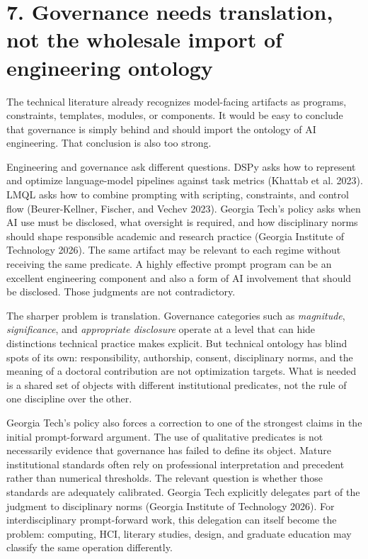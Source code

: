 \documentclass[
]{article}
\begin{document}
\section{7. Governance needs translation, not the wholesale import of
engineering
ontology}\label{governance-needs-translation-not-the-wholesale-import-of-engineering-ontology}

The technical literature already recognizes model-facing artifacts as
programs, constraints, templates, modules, or components. It would be
easy to conclude that governance is simply behind and should import the
ontology of AI engineering. That conclusion is also too strong.

Engineering and governance ask different questions. DSPy asks how to
represent and optimize language-model pipelines against task metrics
(Khattab et al. 2023). LMQL asks how to combine prompting with
scripting, constraints, and control flow (Beurer-Kellner, Fischer, and
Vechev 2023). Georgia Tech's policy asks when AI use must be disclosed,
what oversight is required, and how disciplinary norms should shape
responsible academic and research practice (Georgia Institute of
Technology 2026). The same artifact may be relevant to each regime
without receiving the same predicate. A highly effective prompt program
can be an excellent engineering component and also a form of AI
involvement that should be disclosed. Those judgments are not
contradictory.

The sharper problem is translation. Governance categories such as
\emph{magnitude}, \emph{significance}, and \emph{appropriate disclosure}
operate at a level that can hide distinctions technical practice makes
explicit. But technical ontology has blind spots of its own:
responsibility, authorship, consent, disciplinary norms, and the meaning
of a doctoral contribution are not optimization targets. What is needed
is a shared set of objects with different institutional predicates, not
the rule of one discipline over the other.

Georgia Tech's policy also forces a correction to one of the strongest
claims in the initial prompt-forward argument. The use of qualitative
predicates is not necessarily evidence that governance has failed to
define its object. Mature institutional standards often rely on
professional interpretation and precedent rather than numerical
thresholds. The relevant question is whether those standards are
adequately calibrated. Georgia Tech explicitly delegates part of the
judgment to disciplinary norms (Georgia Institute of Technology 2026).
For interdisciplinary prompt-forward work, this delegation can itself
become the problem: computing, HCI, literary studies, design, and
graduate education may classify the same operation differently.
\end{document}

